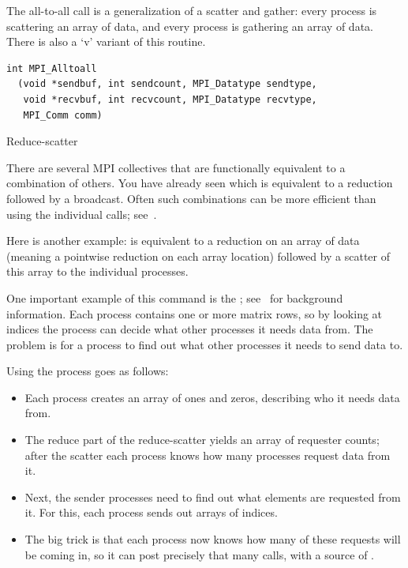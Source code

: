 The all-to-all call is a generalization of a scatter and gather: every
process is scattering an array of data, and every process is gathering
an array of data. There is also a `v' variant of this routine.

\begin{verbatim}
int MPI_Alltoall
  (void *sendbuf, int sendcount, MPI_Datatype sendtype, 
   void *recvbuf, int recvcount, MPI_Datatype recvtype, 
   MPI_Comm comm)
\end{verbatim}

 {Reduce-scatter}
\label{reducescatter}

There are several MPI collectives that are functionally equivalent to
a combination of others. You have already seen  which
is equivalent to a reduction followed by a broadcast. Often such
combinations can be more efficient than using the individual calls;
see~.

Here is another example:  is equivalent
to a reduction on an array of data (meaning a pointwise reduction on each
array location) followed by a scatter of this array to the individual 
processes.

One important example of this command is the
;
see~ for background information.
Each process contains one or more matrix rows, so by looking at indices
the process can decide what other processes it needs data from.
The problem is for a process to find out what other processes 
it needs to send data to. 

Using  the process goes as follows:
\begin{itemize}
\item Each process creates an array of ones and zeros, describing who
  it needs data from.
\item The reduce part of the reduce-scatter yields an array of
  requester counts; after the scatter each process knows how many
  processes request data from it.
\item Next, the sender processes need to find out what elements are
  requested from it. For this, each process sends out arrays of
  indices.
\item The big trick is that each process now knows how many of these
  requests will be coming in, so it can post precisely that many
   calls, with a source of .
\end{itemize}

